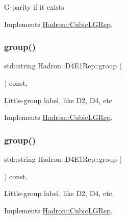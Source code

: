G-\/parity if it exists 

Implements \mbox{\hyperlink{structHadron_1_1CubicLGRep_ace26f7b2d55e3a668a14cb9026da5231}{Hadron\+::\+Cubic\+L\+G\+Rep}}.

\mbox{\label{structHadron_1_1D4E1Rep_a84c3427320fdc63f26dbb3bf4ff86286}} 
\subsubsection{\texorpdfstring{group()}{group()}\hspace{0.1cm}{\footnotesize\ttfamily [1/3]}}
{\footnotesize\ttfamily std\+::string Hadron\+::\+D4\+E1\+Rep\+::group (\begin{DoxyParamCaption}{ }\end{DoxyParamCaption}) const\hspace{0.3cm}{\ttfamily [inline]}, {\ttfamily [virtual]}}

Little-\/group label, like D2, D4, etc. 

Implements \mbox{\hyperlink{structHadron_1_1CubicLGRep_a9bdb14b519a611d21379ed96a3a9eb41}{Hadron\+::\+Cubic\+L\+G\+Rep}}.

\mbox{\label{structHadron_1_1D4E1Rep_a84c3427320fdc63f26dbb3bf4ff86286}} 
\subsubsection{\texorpdfstring{group()}{group()}\hspace{0.1cm}{\footnotesize\ttfamily [2/3]}}
{\footnotesize\ttfamily std\+::string Hadron\+::\+D4\+E1\+Rep\+::group (\begin{DoxyParamCaption}{ }\end{DoxyParamCaption}) const\hspace{0.3cm}{\ttfamily [inline]}, {\ttfamily [virtual]}}

Little-\/group label, like D2, D4, etc. 

Implements \mbox{\hyperlink{structHadron_1_1CubicLGRep_a9bdb14b519a611d21379ed96a3a9eb41}{Hadron\+::\+Cubic\+L\+G\+Rep}}.

\mbox{\label{structHadron_1_1D4E1Rep_a84c3427320fdc63f26dbb3bf4ff86286}} 
